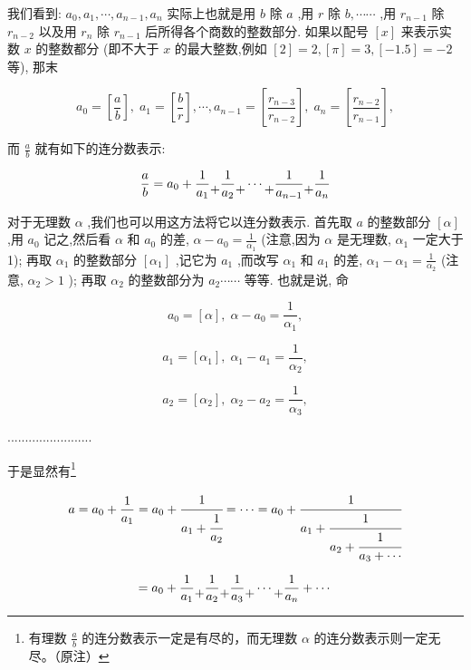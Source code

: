 \documentclass{ctexart}
\newcommand{\cplus}{\raisebox{-1ex}{+}}
\begin{document}
我们看到: \({a}_{0},{a}_{1},\cdots ,{a}_{n - 1},{a}_{n}\) 实际上也就是用 \(b\) 除 \(a\) ,用 \(r\) 除 \(b,\cdots \cdots\) ,用 \({r}_{n - 1}\) 除 \({r}_{n - 2}\) 以及用 \({r}_{n}\) 除 \({r}_{n - 1}\) 后所得各个商数的整数部分. 如果以配号 \(\left\lbrack x\right\rbrack\) 来表示实数 \(x\) 的整数都分 (即不大于 \(x\) 的最大整数,例如 \(\left\lbrack 2\right\rbrack = 2,\left\lbrack \pi \right\rbrack = 3,\left\lbrack {-{1.5}}\right\rbrack = - 2\) 等), 那末

\[
{a}_{0} = \left\lbrack \frac{a}{b}\right\rbrack ,\;{a}_{1} = \left\lbrack \frac{b}{r}\right\rbrack ,\cdots ,{a}_{n - 1} = \left\lbrack \frac{{r}_{n - 3}}{{r}_{n - 2}}\right\rbrack ,\;{a}_{n} = \left\lbrack \frac{{r}_{n - 2}}{{r}_{n - 1}}\right\rbrack ,
\]

而 \(\frac{a}{b}\) 就有如下的连分数表示:

\[
\frac{a}{b} = {a}_{0} + \frac{1}{{a}_{1}} \cplus \frac{1}{{a}_{2}} \cplus \cdots \cplus \frac{1}{{a}_{n - 1}} \cplus \frac{1}{{a}_{n}}
\]

对于无理数 \(\alpha\) ,我们也可以用这方法将它以连分数表示. 首先取 \(a\) 的整数部分 \(\left\lbrack \alpha \right\rbrack\) ,用 \({a}_{0}\) 记之,然后看 \(\alpha\) 和 \({a}_{0}\) 的差, \(\alpha - {a}_{0} = \frac{1}{{\alpha }_{1}}\) (注意,因为 \(\alpha\) 是无理数, \({\alpha }_{1}\) 一定大于 1); 再取 \({\alpha }_{1}\) 的整数部分 \(\left\lbrack {\alpha }_{1}\right\rbrack\) ,记它为 \({ a}_{1}\) ,而改写 \({\alpha }_{1}\) 和 \({a}_{1}\) 的差, \({\alpha }_{1} - {\alpha }_{1} = \frac{1}{{\alpha }_{2}}\) (注意, \({\alpha}_{2} > 1\) ); 再取 \({\alpha}_{2}\) 的整数部分为 \({a}_{2}\cdots \cdots\) 等等. 也就是说, 命

\[
{a}_{0} = \left\lbrack \alpha \right\rbrack ,\;\alpha - {a}_{0} = \frac{1}{{\alpha }_{1}},
\]

\[
{a}_{1} = \left\lbrack {\alpha }_{1}\right\rbrack ,\;{\alpha }_{1} - {a}_{1} = \frac{1}{{\alpha }_{2}},
\]

\[
{a}_{2} = \left\lbrack {\alpha }_{2}\right\rbrack ,\;{\alpha}_{2} - {a}_{2} = \frac{1}{{\alpha }_{3}},
\]

........................

于是显然有\footnote{有理数 $\frac{a}{b}$ 的连分数表示一定是有尽的，而无理数 $\alpha$ 的连分数表示则一定无尽。（原注）}

\[
a = {a}_{0} + \frac{1}{{a}_{1}} = {a}_{0} + \cfrac{1}{{a}_{1} + \cfrac{1}{{a}_{2}}} = \cdots = {a}_{0} + \cfrac{1}{{a}_{1} + \cfrac{1}{{a}_{2} + \cfrac{1}{{a}_{3} + \cdots }}}
\]


\[= {a}_{0} + \frac{1}{{a}_{1}} \cplus \frac{1}{{a}_{2}} \cplus \frac{1}{{a}_{3}} \cplus \cdots \cplus \frac{1}{{a}_{n}} + \cdots \]
\end{document}
